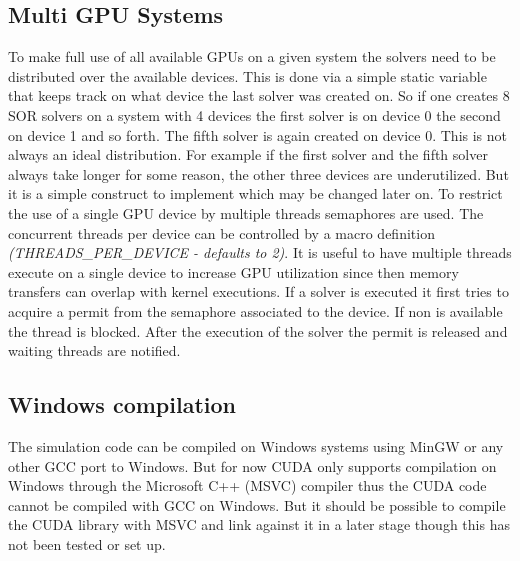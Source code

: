 \documentclass[master.tex]{subfiles}
\begin{document}
\subsection{Multi GPU Systems}\label{sec:multi-gpu}
To make full use of all available GPUs on a given system the solvers need to be distributed over the available devices. This is done via a simple static variable that keeps track on what device the last solver was created on. So if one creates 8 \ac{SOR} solvers on a system with 4 devices the first solver is on device 0 the second on device 1 and so forth. The fifth solver is again created on device 0. This is not always an ideal distribution. For example if the first solver and the fifth solver always take longer for some reason, the other three devices are underutilized. But it is a simple construct to implement which may be changed later on.\newline
To restrict the use of a single GPU device by multiple threads semaphores are used. The concurrent threads per device can be controlled by a macro definition \textit{(THREADS\_PER\_DEVICE - defaults to 2)}. It is useful to have multiple threads execute on a single device to increase GPU utilization since then memory transfers can overlap with kernel executions. If a solver is executed it first tries to acquire a permit from the semaphore associated to the device. If non is available the thread is blocked. After the execution of the solver the permit is released and waiting threads are notified.

\subsection{Windows compilation}
The simulation code can be compiled on Windows systems using MinGW or any other GCC port to Windows. But for now CUDA only supports compilation on Windows through the Microsoft C++ (MSVC) compiler thus the CUDA code cannot be compiled with GCC on Windows. But it should be possible to compile the CUDA library with MSVC and link against it in a later stage though this has not been tested or set up.
\end{document}

